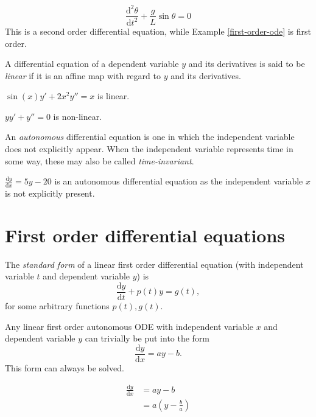 \documentclass[12pt]{article}
\begin{document}
\begin{exmp}
    \[\frac{\mathrm{d}^2\theta}{\mathrm{d}t^2} + \frac{g}{L}\sin\theta = 0\]
    This is a second order differential equation, while Example \ref{first-order-ode} is first order.
\end{exmp}

\begin{defn}
    A differential equation of a dependent variable $y$ and its derivatives is said to be \emph{linear} if it is an affine map with regard to $y$ and its derivatives.
\end{defn}

\begin{exmp}
    $\sin(x)y' + 2x^2y'' = x$ is linear.
\end{exmp}

\begin{exmp}
    $yy' + y'' = 0$ is non-linear.
\end{exmp}

\begin{defn}
    An \emph{autonomous} differential equation is one in which the independent variable does not explicitly appear. When the independent variable represents time in some way, these may also be called \emph{time-invariant}.
\end{defn}

\begin{exmp}
    $\frac{\mathrm{d}y}{\mathrm{d}x} = 5y - 20$ is an autonomous differential equation as the independent variable $x$ is not explicitly present.
\end{exmp}

\section{First order differential equations}

\begin{defn}
    The \emph{standard form} of a linear first order differential equation (with independent variable $t$ and dependent variable $y$) is \[\frac{\mathrm{d}y}{\mathrm{d}t} + p(t)y = g(t),\] for some arbitrary functions $p(t), g(t)$.
\end{defn}

Any linear first order autonomous ODE with independent variable $x$ and dependent variable $y$ can trivially be put into the form \[\frac{\mathrm{d}y}{\mathrm{d}x} = ay - b.\] This form can always be solved.

\begin{align*}
    \frac{\mathrm{d}y}{\mathrm{d}x} &= ay - b \\
    &= a(y - \frac{b}{a})
\end{align*}
\end{document}
